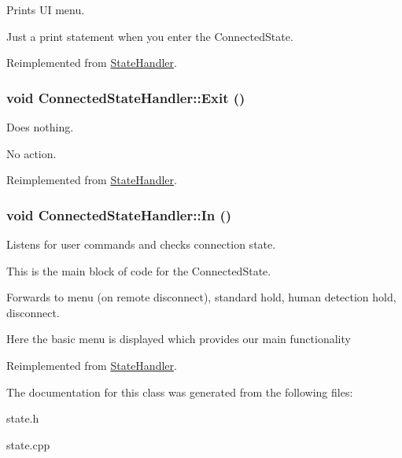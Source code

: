 Prints UI menu. 

Just a print statement when you enter the ConnectedState.

Reimplemented from \hyperlink{classStateHandler_c08036e743cf5172d6931cf3b6d321c6}{StateHandler}.\hypertarget{classConnectedStateHandler_f685982d68b383cf8f4e5f5c19dc419c}{
\subsubsection[{Exit}]{\setlength{\rightskip}{0pt plus 5cm}void ConnectedStateHandler::Exit ()}}
\label{classConnectedStateHandler_f685982d68b383cf8f4e5f5c19dc419c}


Does nothing. 

No action.

Reimplemented from \hyperlink{classStateHandler_5ce0f2cb3d4a9f5aca137d47eac75c1e}{StateHandler}.\hypertarget{classConnectedStateHandler_7a0669af69bd884c9c816e153ed2610c}{
\subsubsection[{In}]{\setlength{\rightskip}{0pt plus 5cm}void ConnectedStateHandler::In ()}}
\label{classConnectedStateHandler_7a0669af69bd884c9c816e153ed2610c}


Listens for user commands and checks connection state. 

This is the main block of code for the ConnectedState.

Forwards to menu (on remote disconnect), standard hold, human detection hold, disconnect.

Here the basic menu is displayed which provides our main functionality 

Reimplemented from \hyperlink{classStateHandler_cee16f855e7354d21abafa47acd1046c}{StateHandler}.

The documentation for this class was generated from the following files:\begin{CompactItemize}
\item 
state.h\item 
state.cpp\end{CompactItemize}
